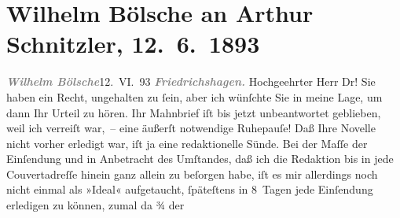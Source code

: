 

         
         \renewcommand{\erwaehntePersonen}{Personen: Cesare Lombroso}
         \renewcommand{\erwaehnteOrte}{Orte: Berlin, Friedrichshagen, Wien}
         \renewcommand{\erwaehnteWerke}{Werke: Das Weib als Verbrecherin und Prostituierte. Anthropologische Studien, gegründet auf eine Darstellung der Biologie und Psychologie des normalen Weibes., Die Braut}
               \section[Wilhelm Bölsche an Arthur Schnitzler, 12. 6. 1893]{ Wilhelm Bölsche an Arthur Schnitzler, 12. 6. 1893}\nopagebreak{}\rehead{ }\begin{ledgroupsized}[t]{13cm}\normalsize\beginnumbering \toendnotes[C]{\smallbreak\pagebreak[2]} 
\toendnotes[C]{\smallbreak}\pstart
           {\pb}\textcolor{gray}{\textbf{\textit{Wilhelm Bölsche}}}\hfill 12. VI. 93\pend
           \pstart
           \textcolor{gray}{\textbf{\textit{Friedrichshagen.}}}\pend
           \pstart{}Hochgeehrter Herr Dr!\pend\pstart
           Sie haben ein Recht, ungehalten zu ſein, aber ich wünſchte Sie in meine Lage, um dann
               Ihr Urteil zu hören. Ihr Mahnbrief iſt bis jetzt unbeantwortet geblieben, weil ich
               verreiſt war, – eine äußerſt notwendige Ruhepauſe! Daß Ihre Novelle nicht vorher erledigt war, iſt ja eine redaktionelle
               Sünde. Bei der Maſſe der Einſendung und in Anbetracht des Umſtandes, daß ich die
               Redaktion bis in jede Couvertadreſſe hinein ganz allein zu beſorgen habe, iſt es mir
               allerdings noch nicht einmal als »Ideal« aufgetaucht, ſpäteſtens in 8 Tagen {\pb}jede Einſendung erledigen zu können, zumal da ¾ der

\end{ledgroupsized}
